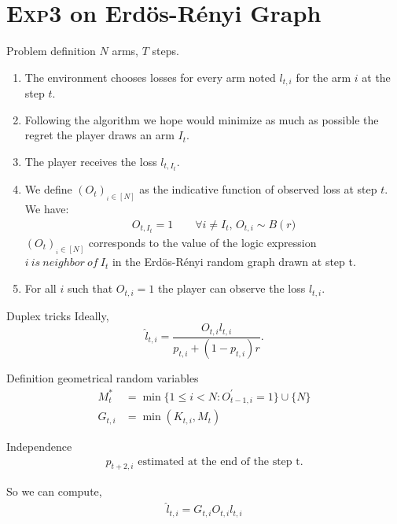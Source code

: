 \documentclass[11pt]{beamer}
\begin{document}
\begin{frame}
\tableofcontents
\end{frame}
\section{\textsc{Exp3} on Erdös-Rényi Graph}
\begin{frame}{Problem definition}
$N$ arms, $T$ steps.
\begin{enumerate}
\item The environment chooses losses for every arm noted $l_{t,i}$ for the arm $i$ at the step $t$.
\item Following the algorithm we hope would minimize as much as possible the regret the player draws an arm $I_t$.
\item The player receives the loss $l_{t,I_t}$.
\item We define $\left(O_t\right)_{_i\in\left[N\right]}$ as the indicative function of observed loss at step $t$. We have:
\begin{align*}
O_{t,I_t}=1 \qquad \forall i \neq I_t,\, O_{t,i} \sim B\left(r\right.)
\end{align*}
$\left(O_t\right)_{_i\in\left[N\right]}$ corresponds to the value of the logic expression $ i \ is\ neighbor\ of\ I_t$ in the Erdös-Rényi random graph drawn at step t.
\item For all $i$ such that $O_{t,i}=1$ the player can observe the loss $l_{t,i}$.
\end{enumerate}
\end{frame}

\begin{frame}{Duplex tricks}
Ideally,
\[
\hat{l}_{t,i}=\frac{O_{t,i}l_{t,i}}{p_{t,i} + (1-p_{t,i})r}.
\]
\begin{block}{Definition geometrical random variables}
\begin{align*}
M_t^* &=\min\{1\leq i<N: O_{t-1,i}^{'} =1\}\cup\{N\}\\
G_{t,i}&=\min\left(K_{t,i},M_t\right)
\end{align*}
\end{block}
\begin{block}{Independence}
\begin{align*}
p_{t+2,i} \text{ estimated at the end of the step t.}
\end{align*}
\end{block}
So we can compute,
\begin{align*}
\hat{l}_{t,i}=G_{t,i}O_{t,i}l_{t,i}
\end{align*}
\end{frame}
\end{document}
